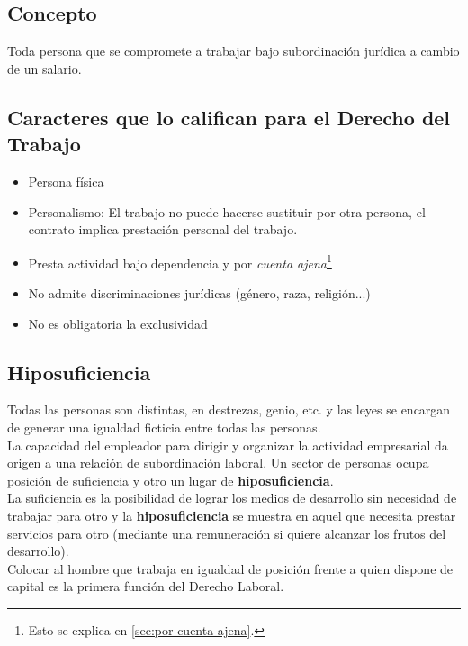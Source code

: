 \documentclass[spanish,12pt,a4paper,titlepage]{report}
\begin{document}
\subsection{Concepto}
Toda persona que se compromete a trabajar bajo subordinación jurídica a cambio de un salario.
\subsection{Caracteres que lo califican para el Derecho del Trabajo}
\begin{itemize}
	\item Persona física
	\item Personalismo: El trabajo no puede hacerse sustituir por otra persona, el contrato implica prestación personal del trabajo.
	\item Presta actividad bajo dependencia y por \textit{cuenta ajena}\footnote{Esto se explica en \ref{sec:por-cuenta-ajena}.}
	\item No admite discriminaciones jurídicas (género, raza, religión...)
	\item No es obligatoria la exclusividad
\end{itemize}

\subsection{Hiposuficiencia}
Todas las personas son distintas, en destrezas, genio, etc. y las leyes se encargan de generar una igualdad ficticia entre todas las personas.\\

La capacidad del empleador para dirigir y organizar la actividad empresarial da origen a una relación de subordinación laboral. Un sector de personas ocupa posición de suficiencia y otro un lugar de \textbf{hiposuficiencia}.\\

La suficiencia es la posibilidad de lograr los medios de desarrollo sin necesidad de trabajar para otro y la \textbf{hiposuficiencia} se muestra en aquel que necesita prestar servicios para otro (mediante una remuneración si quiere alcanzar los frutos del desarrollo).\\

Colocar al hombre que trabaja en igualdad de posición frente a quien dispone de capital es la primera función del Derecho Laboral.
\end{document}
